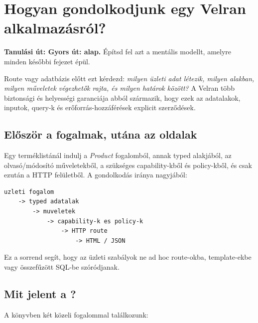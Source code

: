 \chapter{Hogyan gondolkodjunk egy Velran alkalmazásról?}

\noindent\textbf{Tanulási út: Gyors út: alap.} Építsd fel azt a mentális modellt, amelyre minden későbbi fejezet épül.\par\medskip



Route vagy adatbázis előtt ezt kérdezd: \emph{milyen üzleti adat létezik, milyen alakban, milyen műveletek végezhetők rajta, és milyen határok között?} A Velran több biztonsági és helyességi garanciája abból származik, hogy ezek az adatalakok, inputok, query-k és erőforrás-hozzáférések explicit szerződések.

\section{Először a fogalmak, utána az oldalak}

Egy terméklistánál indulj a \emph{Product} fogalomból, annak typed alakjából, az olvasó/módosító műveletekből, a szükséges capability-kből és policy-kből, és csak ezután a HTTP felületből. A gondolkodás iránya nagyjából:

\begin{lstlisting}
uzleti fogalom
    -> typed adatalak
        -> muveletek
            -> capability-k es policy-k
                -> HTTP route
                    -> HTML / JSON
\end{lstlisting}

Ez a sorrend segít, hogy az üzleti szabályok ne ad hoc route-okba, template-ekbe vagy összefűzött SQL-be szóródjanak.

\section{Mit jelent a ?}

A könyvben két közeli fogalommal találkozunk:

